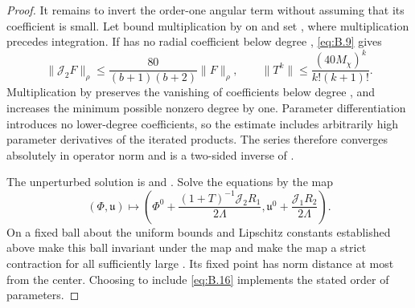 \begin{proof}
It remains to invert the order-one angular term without assuming that its coefficient is small. Let
 bound multiplication by  on
 and set
, where multiplication precedes integration. If
 has no radial coefficient below degree ,
\eqref{eq:B.9} gives
\begin{equation*}
  \lVert\mathcal J_2F\rVert_\rho
  \leq\frac{80}{(b+1)(b+2)}\lVert F\rVert_\rho,
  \qquad
  \lVert T^k\rVert\leq\frac{(40M_\chi)^k}{k!(k+1)!}.
\end{equation*}
Multiplication by  preserves the vanishing of coefficients below degree
, and  increases the minimum possible
nonzero degree by one. Parameter differentiation introduces no lower-degree coefficients, so the
estimate includes arbitrarily high parameter derivatives of the iterated products. The series
 therefore converges absolutely in operator norm and is a
two-sided inverse of .

The unperturbed solution is
 and
. Solve the equations by the map
\begin{equation*}
  (\Phi,\mathfrak u)\longmapsto
  \left(\Phi^0+\frac{(1+T)^{-1}\mathcal J_2R_1}{2\Lambda},
        \mathfrak u^0+\frac{\mathcal J_1R_2}{2\Lambda}\right).
\end{equation*}
On a fixed ball about  the uniform bounds and Lipschitz
constants established above make this ball invariant under the map and make the map a strict
contraction for all sufficiently large . Its fixed point has norm
distance at most  from the center. Choosing
 to include \eqref{eq:B.16} implements the stated order of
parameters.


\end{proof}

